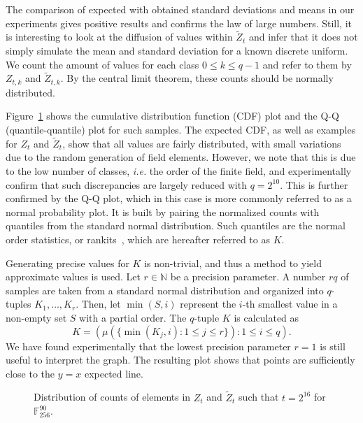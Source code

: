 \documentclass[draft, 12pt, a4paper, oneside]{memoir}
\theoremstyle{definition}
\begin{document}
The comparison of expected with obtained standard deviations and means in our
experiments gives positive results and confirms the law of large numbers.
Still, it is interesting to look at the diffusion of values within
$\widetilde{Z}_{t}$ and infer that it does not simply simulate the mean and
standard deviation for a known discrete uniform. We count the amount of values
for each class $0 \leq k \leq q - 1$ and refer to them by $Z_{t, k}$ and
$\widetilde{Z}_{t, k}$. By the central limit theorem, these counts should be
normally distributed.

Figure~\ref{fig:3} shows the cumulative distribution function (CDF) plot and
the Q-Q (quantile-quantile) plot for such samples. The expected CDF, as well as
examples for $Z_{t}$ and $\widetilde{Z}_{t}$, show that all values are fairly
distributed, with small variations due to the random generation of field
elements. However, we note that this is due to the low number of classes,
\emph{i.e.} the order of the finite field, and experimentally confirm that such
discrepancies are largely reduced with $q = 2^{10}$. This is further confirmed
by the Q-Q plot, which in this case is more commonly referred to as a normal probability plot. It is built by pairing the normalized counts with quantiles from the standard normal distribution. Such quantiles are the normal order statistics, or rankits~\cite{Ipsen:194405}, which are hereafter referred to as $K$. 

Generating precise values for $K$ is non-trivial, and thus a method to yield approximate values is used. Let $r \in \mathbb{N}$ be a precision parameter. A number $rq$ of samples are taken from a standard normal distribution and organized into $q$-tuples $K_{1}, \dots, K_{r}$. Then, let $\min(S, i)$ represent the $i$-th smallest value in a non-empty set $S$ with a partial order. The $q$-tuple $K$ is calculated as 
\[
    K = (\mu(\{\min(K_{j}, i) : 1 \leq j \leq r\}) : 1 \leq i \leq q).
\]
We have found experimentally that the lowest precision parameter $r = 1$ is still useful to interpret the graph. The resulting plot shows that points are sufficiently close to the $y = x$ expected line.

\begin{figure}[htbp]
  \caption{Distribution of counts of elements in $Z_{t}$ and
    $\widetilde{Z}_{t}$ such that $t = 2^{16}$ for
    $\mathbb{F}_{256}^{90}$.}\label{fig:3}
\end{figure}
\end{document}

